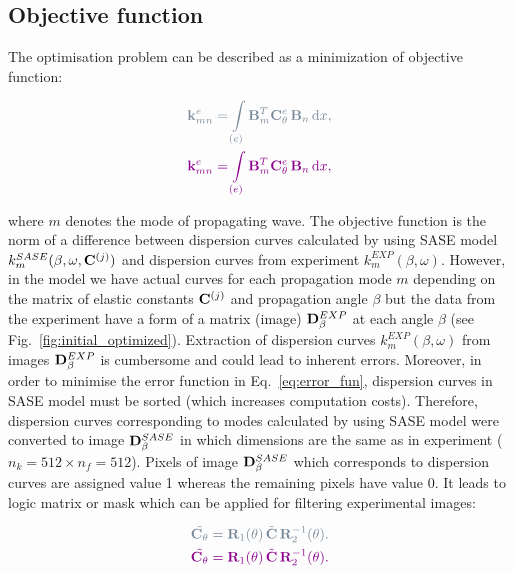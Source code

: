 	
	
\subsection{Objective function}
	
	The optimisation problem can be described as a minimization of  objective function:
	
\begin{equation}
\begin{aligned}
\DIFdelmath{
	\matr{k}_{mn}^e= \int \limits_{(e)} \matr{B}_m^{T} \matr{C}_{\theta}^e \, \matr{B}_n\, 
	\ud x, 
}\\
\DIFaddmath{
	\matr{k}_{mn}^e= \int \limits_{(e)} \matr{B}_m^{T} \matr{C}_{\theta}^e \, \matr{B}_n\, \ud x, 
}
\end{aligned}
\label{eq:stiffness_matrix_e}
\end{equation}

	where \(m\) denotes the mode of propagating wave.
	The objective function is the norm of a difference between dispersion curves 
	calculated by using SASE model \(k^{SASE}_{m}(\beta,\omega,\mathbf{C}^{(j)})\) and 
	dispersion curves from experiment \(k^{EXP}_{m}(\beta,\omega)\). However, in the 
	model we have actual curves for each propagation mode \(m\) depending on the 
	matrix of elastic constants \(\mathbf{C}^{(j)}\) and propagation angle \(\beta\) but the 
	data 
	from the experiment have a form of a matrix (image) \(\mathbf{D}^{EXP}_{\beta}\) at 
	each angle \(\beta\) (see Fig.~\ref{fig:initial_optimized}). Extraction of dispersion 
	curves \(k^{EXP}_{m}(\beta,\omega)\) from images \(\mathbf{D}^{EXP}_{\beta}\) is 
	cumbersome and could lead to inherent errors. Moreover, in order to minimise the 
	error function in Eq.~\ref{eq:error_fun}, dispersion curves in SASE model must be 
	sorted (which increases computation costs). Therefore, dispersion curves 
	corresponding to  modes   
	calculated by using SASE model were converted to  image 
	\(\mathbf{D}^{SASE}_{\beta}\) in which dimensions are the same as in  experiment 
	( \(n_k=512\times n_f=512\)). Pixels of  image \(\mathbf{D}^{SASE}_{\beta}\) 
	which corresponds to dispersion curves are assigned value 1 whereas the remaining 
	pixels have value 0. It leads to logic matrix or mask which can be applied for filtering 
	experimental images: 
	
\begin{equation}
\begin{aligned}
\DIFdelmath{
	\tilde{ \matr{C}_{\theta}}= \matr{R}_1(\theta) \,\tilde{\matr{C}} 
	\,\matr{R}_2^{-1}(\theta).
	}\\
\DIFaddmath{
	\tilde{ \matr{C}_{\theta}}= \matr{R}_1(\theta) \,\tilde{\matr{C}} \,\matr{R}_2^{-1}(\theta).
	}
\end{aligned}
\label{eq:elasticity_tensor}
\end{equation}

